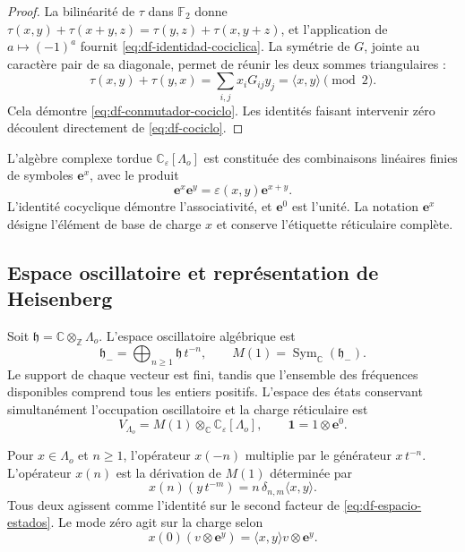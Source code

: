 \begin{proof}
La bilinéarité de \(\tau\) dans \(\mathbb F_2\) donne \(\tau(x,y)+\tau(x+y,z)=\tau(y,z)+\tau(x,y+z)\), et l’application de \(a\mapsto(-1)^a\) fournit \eqref{eq:df-identidad-cociclica}. La symétrie de \(G\), jointe au caractère pair de sa diagonale, permet de réunir les deux sommes triangulaires :
\[
 \tau(x,y)+\tau(y,x)
 =\sum_{i,j}x_iG_{ij}y_j
 =\langle x,y\rangle\pmod2.
\]
Cela démontre \eqref{eq:df-conmutador-cociclo}. Les identités faisant intervenir zéro découlent directement de \eqref{eq:df-cociclo}.
\end{proof}

L’algèbre complexe tordue \(\mathbb C_{\varepsilon}[\Lambda_o]\) est constituée des combinaisons linéaires finies de symboles \(\mathbf e^x\), avec le produit
\begin{equation}
 \mathbf e^x\mathbf e^y=\varepsilon(x,y)\mathbf e^{x+y}.
 \label{eq:df-producto-torcido}
\end{equation}
L’identité cocyclique démontre l’associativité, et \(\mathbf e^0\) est l’unité. La notation \(\mathbf e^x\) désigne l’élément de base de charge \(x\) et conserve l’étiquette réticulaire complète.

\subsection{Espace oscillatoire et représentation de Heisenberg}
\label{subsec:df-osciladores}


Soit \(\mathfrak h=\mathbb C\otimes_{\mathbb Z}\Lambda_o\). L’espace oscillatoire algébrique est
\[
 \mathfrak h_-=
 \bigoplus_{n\geq1}\mathfrak h\,t^{-n},
 \qquad
 M(1)=\operatorname{Sym}_{\mathbb C}(\mathfrak h_-).
\]
Le support de chaque vecteur est fini, tandis que l’ensemble des fréquences disponibles comprend tous les entiers positifs. L’espace des états conservant simultanément l’occupation oscillatoire et la charge réticulaire est
\begin{equation}
 V_{\Lambda_o}=M(1)\otimes_{\mathbb C}
                  \mathbb C_{\varepsilon}[\Lambda_o],
 \qquad \mathbf1=1\otimes\mathbf e^0.
 \label{eq:df-espacio-estados}
\end{equation}

Pour \(x\in\Lambda_o\) et \(n\geq1\), l’opérateur \(x(-n)\) multiplie par le générateur \(x\,t^{-n}\). L’opérateur \(x(n)\) est la dérivation de \(M(1)\) déterminée par
\begin{equation}
 x(n)(y\,t^{-m})=n\,\delta_{n,m}\langle x,y\rangle.
 \label{eq:df-derivacion-oscilatoria}
\end{equation}
Tous deux agissent comme l’identité sur le second facteur de \eqref{eq:df-espacio-estados}. Le mode zéro agit sur la charge selon
\[
 x(0)(v\otimes\mathbf e^y)
 =\langle x,y\rangle v\otimes\mathbf e^y.
\]

